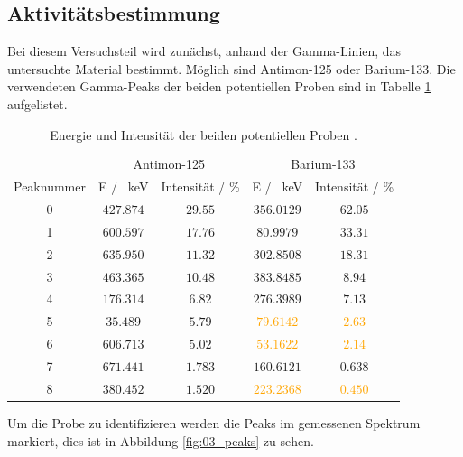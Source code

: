 \subsection{Aktivitätsbestimmung}
Bei diesem Versuchsteil wird zunächst, anhand der Gamma-Linien, das untersuchte Material bestimmt.
Möglich sind Antimon-125 oder Barium-133.
Die verwendeten Gamma-Peaks der beiden potentiellen Proben sind in Tabelle \ref{tab:Ba_133Sb_125} aufgelistet.
\FloatBarrier
\begin{table}
  \centering
  \caption{Energie und Intensität der beiden potentiellen Proben \cite{Gamma_lit}.}
  \label{tab:Ba_133Sb_125}
  \begin{tabular}{c c c c c}
    \toprule
    & \multicolumn{2}{c}{Antimon-125} & \multicolumn{2}{c}{Barium-133} \\
    \cmidrule(lr){2-3}\cmidrule(lr){4-5}
    Peaknummer & E / \SI{}{\kilo\eV} & Intensität / \%& E / \SI{}{\kilo\eV} & Intensität / \%\\
    \midrule
    0&$\num{427.874}$&$\num{29.55}$&$\num{356.0129}$&$\num{62.05}$\\
    1&$\num{600.597}$&$\num{17.76}$&$\num{80.9979}$&$\num{33.31}$\\
    2&$\num{635.950}$&$\num{11.32}$&$\num{302.8508}$&$\num{18.31}$\\
    3&$\num{463.365}$&$\num{10.48}$&$\num{383.8485}$&$\num{8.94}$\\
    4&$\num{176.314}$&$\num{6.82}$ &$\num{276.3989}$&$\num{7.13}$\\
    5&$\num{35.489}$&$\num{5.79}$  &\textcolor{orange}{$\num{79.6142}$}&\textcolor{orange}{$\num{2.63}$}\\
    6&$\num{606.713}$&$\num{5.02}$ &\textcolor{orange}{$\num{53.1622}$}&\textcolor{orange}{$\num{2.14}$}\\
    7&$\num{671.441}$&$\num{1.783}$&$\num{160.6121}$&$\num{0.638}$\\
    8&$\num{380.452}$&$\num{1.520}$&\textcolor{orange}{$\num{223.2368}$}&\textcolor{orange}{$\num{0.450}$}\\
    \bottomrule
  \end{tabular}
\end{table}
\FloatBarrier
Um die Probe zu identifizieren werden die Peaks im gemessenen Spektrum markiert, dies ist in Abbildung \ref{fig:03_peaks} zu sehen.
\FloatBarrier
